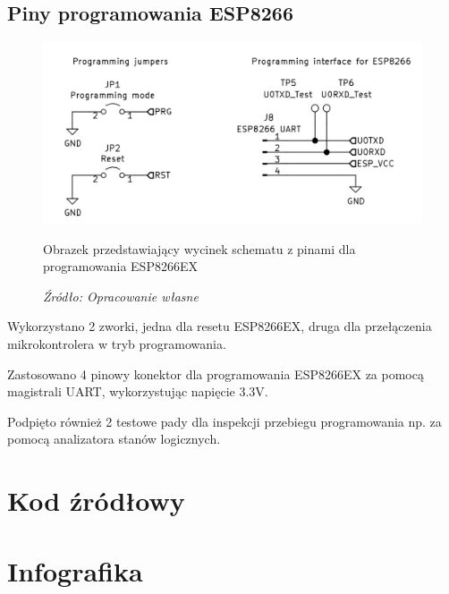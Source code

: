 \documentclass[12pt,a4paper,oneside]{memoir}
\begin{document}
\section{Piny programowania ESP8266}
\begin{figure}[!h]
	\centering
	\includegraphics[scale=0.4]{images/sch/sch-14.png}
	{\tytulyrozdzialow \footnotesize \caption[Schemat - programowanie wewnątrzukładowe] {Obrazek przedstawiający wycinek schematu z pinami dla programowania ESP8266EX}}
	\caption*{\textit{Źródło: Opracowanie własne}}
\end{figure}
\par Wykorzystano 2 zworki, jedna dla resetu ESP8266EX, druga dla przełączenia mikrokontrolera w tryb programowania.
\par Zastosowano 4 pinowy konektor dla programowania ESP8266EX za pomocą magistrali UART, wykorzystując napięcie 3.3V. 
\par Podpięto również 2 testowe pady dla inspekcji przebiegu programowania np. za pomocą analizatora stanów logicznych. 
\newpage
\chapter{Kod źródłowy} 

\newpage
\chapter{Infografika} 
\end{document}
